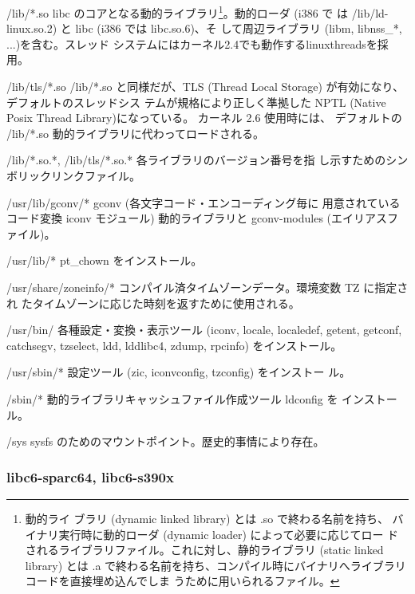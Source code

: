 \documentclass[mingoth,a4paper]{jsarticle}
\newenvironment{gdescription}%
{%
   \begin{list}{}%
   {%
      \setlength{\itemindent}{0mm}
      \setlength{\leftmargin}{45mm}%
      \setlength{\rightmargin}{0zw}%
      \setlength{\labelsep}{4mm}%
      \setlength{\labelwidth}{4cm}%
      \setlength{\itemsep}{0em}%
      \setlength{\parsep}{0cm}%
      \setlength{\listparindent}{0cm}%
      \let\makelabel\gdescriptionlabel
   }
}{%
   \end{list}%
}
\newcommand*\gdescriptionlabel[1]{\hspace\labelsep\normalfont\bfseries #1}
\begin{document}
    \begin{gdescription}

    \item[/lib/*.so] libc のコアとなる動的ライブラリ\footnote{動的ライ
        ブラリ (dynamic linked library) とは .so で終わる名前を持ち、
        バイナリ実行時に動的ローダ (dynamic loader) によって必要に応じてロー
        ドされるライブラリファイル。これに対し、静的ライブラリ (static linked library) 
        とは .a で終わる名前を持ち、コンパイル時にバイナリへライブラリコードを直接埋め込んでしま
        うために用いられるファイル。}。動的ローダ (i386 で
    	       は /lib/ld-linux.so.2) と libc (i386 では libc.so.6)、そ
	       して周辺ライブラリ (libm, libnss\_*, ...)を含む。スレッド
	       システムにはカーネル2.4でも動作するlinuxthreadsを採用。
    \item[/lib/tls/*.so] /lib/*.so と同様だが、TLS (Thread Local
	       Storage) が有効になり、デフォルトのスレッドシス
	       テムが規格により正しく準拠した NPTL (Native Posix Thread Library)になっている。
	       カーネル 2.6 使用時には、
	       デフォルトの /lib/*.so 動的ライブラリに代わってロードされる。
    \item[/lib/*.so.*, /lib/tls/*.so.*] 各ライブラリのバージョン番号を指
	       し示すためのシンボリックリンクファイル。
    \item[/usr/lib/gconv/*] gconv (各文字コード・エンコーディング毎に
	       用意されているコード変換 iconv モジュール) 動的ライブラリと gconv-modules (エイリアスファイル)。
    \item[/usr/lib/*] pt\_chown をインストール。
    \item[/usr/share/zoneinfo/*] コンパイル済タイムゾーンデータ。環境変数 TZ に指定され
	       たタイムゾーンに応じた時刻を返すために使用される。
    \item[/usr/bin/] 各種設定・変換・表示ツール (iconv, locale,
	       localedef, getent, getconf, catchsegv, tzselect, ldd,
	       lddlibc4, zdump, rpcinfo) をインストール。
    \item[/usr/sbin/*] 設定ツール (zic, iconvconfig, tzconfig) をインストー
	       ル。
    \item[/sbin/*] 動的ライブラリキャッシュファイル作成ツール ldconfig を
	       インストール。
    \item[/sys] sysfs のためのマウントポイント。歴史的事情により存在。
    \end{gdescription}

  \subsubsection{libc6-sparc64, libc6-s390x}
\end{document}
